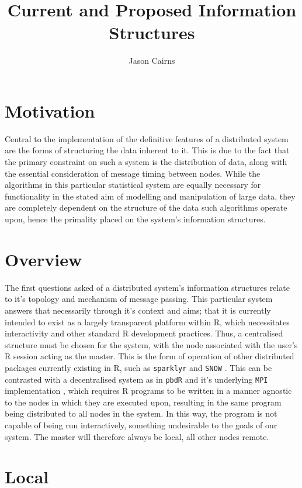 \documentclass[a4paper]{article}
\begin{document}
\title{Current and Proposed Information Structures}
\author{Jason Cairns}
  
\maketitle

\section{Motivation}
Central to the implementation of the definitive features of a distributed
system are the forms of structuring the data inherent to it.
This is due to the fact that the primary constraint on such a system is the
distribution of data, along with the essential consideration of message timing
between nodes. 
While the algorithms in this particular statistical system are equally
necessary for functionality in the stated aim of modelling and manipulation of
large data, they are completely dependent on the structure of the data such
algorithms operate upon, hence the primality placed on the system's information
structures.

\section{Overview}
The first questions asked of a distributed system's information structures
relate to it's topology and mechanism of message passing. 
This particular system answers that necessarily through it's context and aims;
that it is currently intended to exist as a largely transparent platform within
R, which necessitates interactivity and other standard R development practices.
Thus, a centralised structure must be chosen for the system, with the node
associated with the user's R session acting as the master.
This is the form of operation of other distributed packages currently existing
in R, such as \texttt{sparklyr} \cite{luraschi20} and \texttt{SNOW}
\cite{tierney18}.
This can be contrasted with a decentralised system as in \texttt{pbdR} and it's
underlying \texttt{MPI} implementation \cite{pbdR2012}, which requires R
programs to be written in a manner agnostic to the nodes in which they are
executed upon, resulting in the same program being distributed to all nodes in
the system.
In this way, the program is not capable of being run interactively, something
undesirable to the goals of our system.
The master will therefore always be local, all other nodes remote.

\section{Local}
\end{document}

